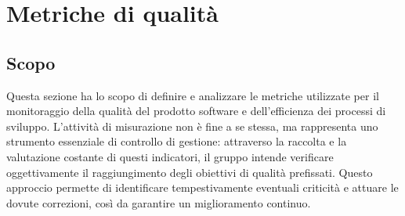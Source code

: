\documentclass[a4paper,12pt]{article}
\begin{document}
\newpage

\section{Metriche di qualità}
    \label{sec:metriche}
    \subsection{Scopo}
        Questa sezione ha lo scopo di definire e analizzare le metriche utilizzate per il monitoraggio della qualità del prodotto software e dell'efficienza dei processi di sviluppo.
        L'attività di misurazione non è fine a se stessa, ma rappresenta uno strumento essenziale di controllo di gestione: attraverso la raccolta e la valutazione costante di questi indicatori,
        il gruppo intende verificare oggettivamente il raggiungimento degli obiettivi di qualità prefissati. 
        Questo approccio permette di identificare tempestivamente eventuali criticità e attuare le dovute correzioni, così da garantire un miglioramento continuo.
\end{document}
